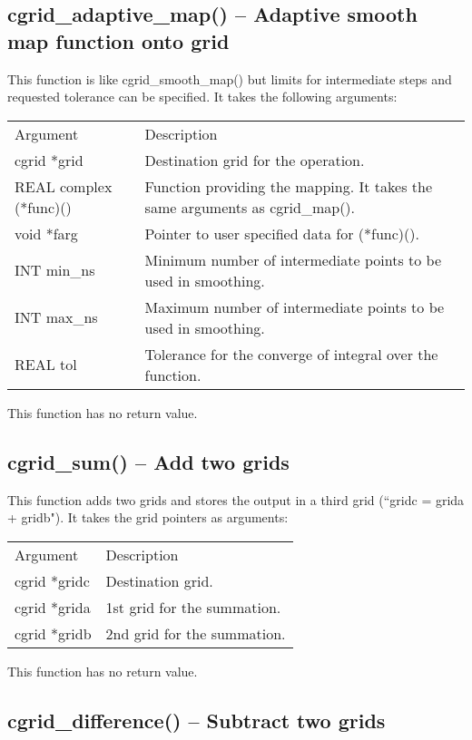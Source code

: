 \documentclass[12pt,letterpaper]{report}
\begin{document}
\subsection{cgrid\_adaptive\_map() -- Adaptive smooth map function onto grid}

This function is like cgrid\_smooth\_map() but limits for intermediate steps and requested tolerance can be specified. It takes the following arguments:
\begin{longtable}{p{} p{}}
Argument & Description\\
\cline{1-2}
cgrid *grid & Destination grid for the operation.\\
REAL complex (*func)() & Function providing the mapping. It takes the same arguments as cgrid\_map().\\
void *farg & Pointer to user specified data for (*func)().\\
INT min\_ns & Minimum number of intermediate points to be used in smoothing.\\
INT max\_ns & Maximum number of intermediate points to be used in smoothing.\\
REAL tol & Tolerance for the converge of integral over the function.\\
\end{longtable}
\noindent
This function has no return value.

\subsection{cgrid\_sum() -- Add two grids}

This function adds two grids and stores the output in a third grid (``gridc = grida + gridb"). It takes the grid pointers as arguments:
\begin{longtable}{p{} p{}}
Argument & Description\\
\cline{1-2}
cgrid *gridc & Destination grid.\\
cgrid *grida & 1st grid for the summation.\\
cgrid *gridb & 2nd grid for the summation.\\
\end{longtable}
\noindent
This function has no return value.

\subsection{cgrid\_difference() -- Subtract two grids}
\end{document}
